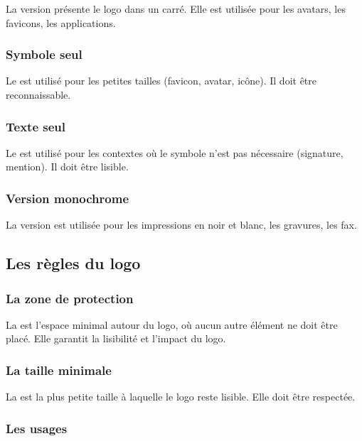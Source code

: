La version  présente le logo dans un carré. Elle est utilisée pour les avatars, les favicons, les applications.

\subsubsection{Symbole seul}

Le  est utilisé pour les petites tailles (favicon, avatar, icône). Il doit être reconnaissable.

\subsubsection{Texte seul}

Le  est utilisé pour les contextes où le symbole n'est pas nécessaire (signature, mention). Il doit être lisible.

\subsubsection{Version monochrome}

La version  est utilisée pour les impressions en noir et blanc, les gravures, les fax.

\subsection{Les règles du logo}

\subsubsection{La zone de protection}

La  est l'espace minimal autour du logo, où aucun autre élément ne doit être placé. Elle garantit la lisibilité et l'impact du logo.

\subsubsection{La taille minimale}

La  est la plus petite taille à laquelle le logo reste lisible. Elle doit être respectée.

\subsubsection{Les usages}

